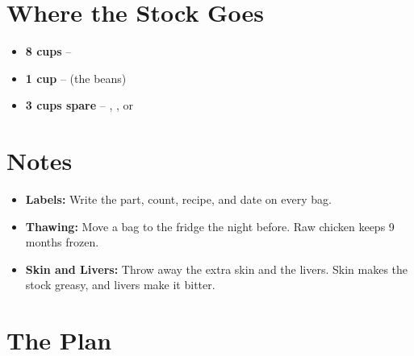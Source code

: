 \section*{Where the Stock Goes}

\begin{itemize}
      \item \textbf{8 cups} – 
      \item \textbf{1 cup} –  (the beans)
      \item \textbf{3 cups spare} – , , or 
\end{itemize}

\section*{Notes}

\begin{itemize}
      \item \textbf{Labels:} Write the part, count, recipe, and date on every bag.
      \item \textbf{Thawing:} Move a bag to the fridge the night before. Raw chicken keeps 9 months frozen.
      \item \textbf{Skin and Livers:} Throw away the extra skin and the livers. Skin makes the stock greasy, and livers make it bitter.
\end{itemize}

\newpage
{}
\section*{The Plan}

